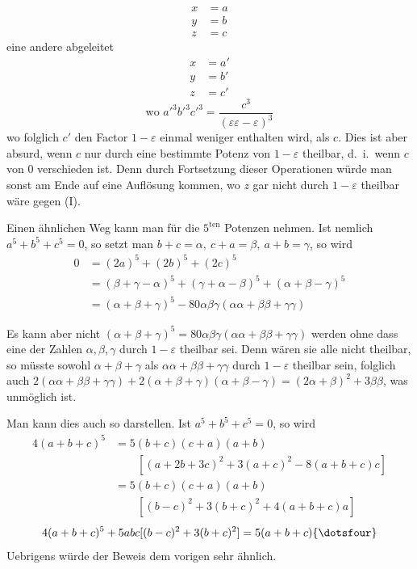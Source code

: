 %
\[
\begin{aligned}
x&=a\\
y&=b\\
z&=c
\end{aligned}
\]
eine andere abgeleitet
\[
\begin{aligned}
x&=a'\\
y&=b'\\
z&=c'
\end{aligned}
\]
\[
\text{wo }a'^3b'^3c'^3=\frac{c^3}{(\varepsilon\varepsilon-\varepsilon)^3}
\]
wo folglich $c'$ den Factor $1-\varepsilon$ einmal weniger enthalten wird, als $c$. Dies ist aber absurd, wenn $c$ nur durch eine bestimmte Potenz von $1-\varepsilon$ theilbar, d.\ i.\ wenn $c$ von $0$ verschieden ist. Denn durch Fortsetzung dieser Operationen würde man sonst am Ende auf eine Auflösung kommen, wo $z$ gar nicht durch $1-\varepsilon$ theilbar wäre gegen (I).

Einen ähnlichen Weg kann man für die $5^{\mathrm{ten}}$ Potenzen nehmen. Ist nemlich $a^5+b^5+c^5=0$, so setzt man $b+c=\alpha,\ c+a=\beta,\ a+b=\gamma$, so wird
\[
\begin{aligned}
0&=(2a)^5+(2b)^5+(2c)^5\\
&=(\beta+\gamma-\alpha)^5+(\gamma+\alpha-\beta)^5+(\alpha+\beta-\gamma)^5\\
&=(\alpha+\beta+\gamma)^5-80\alpha\beta\gamma(\alpha\alpha+\beta\beta+\gamma\gamma)
\end{aligned}
\]

Es kann aber nicht $(\alpha+\beta+\gamma)^5=80\alpha\beta\gamma(\alpha\alpha+\beta\beta+\gamma\gamma)$ werden ohne dass eine der Zahlen $\alpha,\beta,\gamma$ durch $1-\varepsilon$ theilbar sei. Denn wären sie alle nicht theilbar, so müsste sowohl $\alpha+\beta+\gamma$ als $\alpha\alpha+\beta\beta+\gamma\gamma$ durch $1-\varepsilon$ theilbar sein, folglich auch $2(\alpha\alpha+\beta\beta+\gamma\gamma)+2(\alpha+\beta+\gamma)(\alpha+\beta-\gamma)=(2\alpha+\beta)^2+3\beta\beta$, was unmöglich ist.

Man kann dies auch so darstellen. Ist $a^5+b^5+c^5=0$, so wird
\[
\begin{aligned}
4(a+b+c)^5&=5(b+c)(c+a)(a+b)\\
&\qquad[(a+2b+3c)^2+3(a+c)^2-8(a+b+c)c]\\
&=5(b+c)(c+a)(a+b)\\
&\qquad[(b-c)^2+3(b+c)^2+4(a+b+c)a]
\end{aligned}
\]
\[
4(a+b+c)^5+5abc[(b-c)^2+3(b+c)^2]=5(a+b+c)\{\dotsfour\}
\]
Uebrigens würde der Beweis dem vorigen sehr ähnlich.

